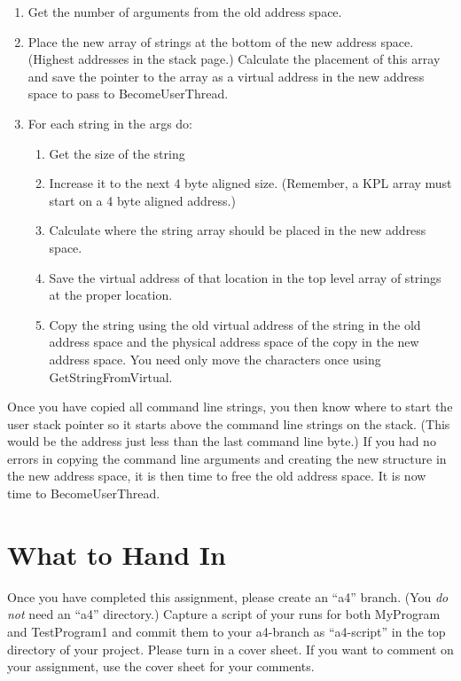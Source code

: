 \documentclass[12pt]{article}
\begin{document}
\begin{enumerate}
\item Get the number of arguments from the old address space.
\item Place the new array of strings at the bottom of the new address
  space. (Highest addresses in the stack page.)  Calculate the
  placement of this array and save the pointer to the array as a
  virtual address in the new address space to pass to
  BecomeUserThread.
\item For each string in the args do:
  \begin{enumerate}
  \item Get the size of the string
  \item Increase it to the next 4 byte aligned size. (Remember,
    a KPL array must start on a 4 byte aligned address.)
  \item Calculate where the string array should be placed in the
    new address space.
  \item Save the virtual address of that location in the
    top level array of strings at the proper location.
  \item Copy the string using the old virtual address of the
    string in the old address space and the physical address
    space of the copy in the new address space.  You need
    only move the characters once using GetStringFromVirtual.
  \end{enumerate}
  \end{enumerate}

Once you have copied all command line strings, you then know
where to start the user stack pointer so it starts above the
command line strings on the stack.  (This would be the address
just less than the last command line byte.) If you had no errors in
copying the command line arguments and creating the new structure
in the new address space, it is then time to free the old address
space.  It is now time to BecomeUserThread.

\section{What to Hand In}

Once you have completed this assignment, please create an ``a4''
branch.  (You { \em do not } need an ``a4'' directory.)  Capture a
script of your runs for both MyProgram and TestProgram1 and commit
them to your a4-branch as ``a4-script'' in the top directory of your
project.  Please turn in a cover sheet.  If you want to comment on
your assignment, use the cover sheet for your comments.
\end{document}

